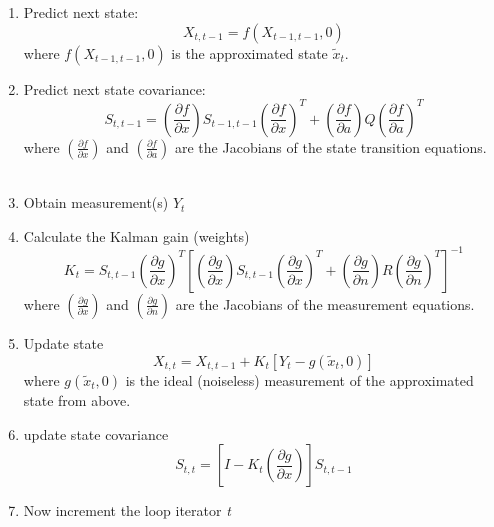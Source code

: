 \documentclass{article}
\begin{document}
\begin{enumerate}
\item Predict next state: 
\begin{equation}
X_{t,t-1} = f(X_{t-1,t-1},0)
\label{eq:}
\end{equation}
where $f(X_{t-1,t-1},0)$ is the approximated state $\tilde{x}_t$. \\
\item Predict next state covariance: 
\begin{equation}
S_{t,t-1} =
\left( \frac{\partial f}{\partial x} \right)
S_{t-1,t-1} \left(\frac{\partial f}{\partial x}\right)^T
+ \left( \frac{\partial f}{\partial a} \right) Q
\left(\frac{\partial f}{\partial a}\right)^T
\end{equation}
where $\left(\frac{\partial f}{\partial x}\right)$ and $\left(\frac{\partial f}{\partial a}\right)$ are the Jacobians of the state transition equations. \\
\\
\item Obtain measurement(s) $Y_t$ \\
\item Calculate the Kalman gain (weights)
\begin{equation}
K_t = S_{t,t-1} 
\left( \frac{\partial g}{\partial x} \right)^T
\left[
\left( \frac{\partial g}{\partial x} \right)
S_{t,t-1}
\left( \frac{\partial g}{\partial x} \right)^T
+
\left( \frac{\partial g}{\partial n} \right)
R
\left( \frac{\partial g}{\partial n} \right)^T
\right]^{-1}
\end{equation}
where $\left(\frac{\partial g}{\partial x}\right)$ and $\left(\frac{\partial g}{\partial n}\right)$ are the Jacobians of the measurement equations.

\item Update state
\begin{equation}
X_{t,t} = X_{t,t-1} + K_t [Y_t - g(\tilde{x}_t,0)]
\end{equation}
where $g(\tilde{x}_t,0)$ is the ideal (noiseless) measurement of the approximated state from above.

\item update state covariance
\begin{equation}
S_{t,t} = \left[ I - K_t
\left( \frac{\partial g}{\partial x} \right) \right] S_{t,t-1}
\end{equation}

\item Now increment the loop iterator \textit{t}
\end{enumerate}
\end{document}
